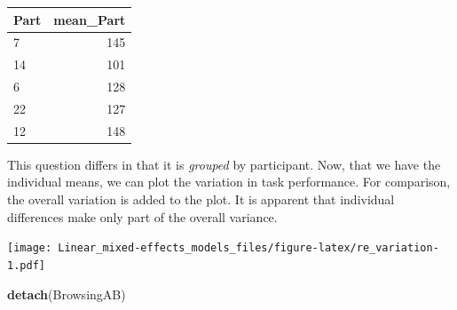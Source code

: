 \documentclass[]{svmono}
\newenvironment{Shaded}{\begin{snugshade}}{\end{snugshade}}
\newcommand{\KeywordTok}[1]{\textcolor[rgb]{0.13,0.29,0.53}{\textbf{#1}}}
\newcommand{\DataTypeTok}[1]{\textcolor[rgb]{0.13,0.29,0.53}{#1}}
\newcommand{\DecValTok}[1]{\textcolor[rgb]{0.00,0.00,0.81}{#1}}
\newcommand{\StringTok}[1]{\textcolor[rgb]{0.31,0.60,0.02}{#1}}
\newcommand{\OperatorTok}[1]{\textcolor[rgb]{0.81,0.36,0.00}{\textbf{#1}}}
\newcommand{\NormalTok}[1]{#1}
\theoremstyle{definition}
\theoremstyle{definition}
\theoremstyle{definition}
\theoremstyle{remark}
\begin{document}
\begin{tabular}{l|r}
\hline
Part & mean\_Part\\
\hline
7 & 145\\
\hline
14 & 101\\
\hline
6 & 128\\
\hline
22 & 127\\
\hline
12 & 148\\
\hline
\end{tabular}

This question differs in that it is \emph{grouped} by participant. Now,
that we have the individual means, we can plot the variation in task
performance. For comparison, the overall variation is added to the plot.
It is apparent that individual differences make only part of the overall
variance.

\begin{Shaded}
\end{Shaded}

\texttt{[image: Linear\_mixed-effects\_models\_files/figure-latex/re\_variation-1.pdf]}

\begin{Shaded}
\begin{Highlighting}[]
\KeywordTok{detach}\NormalTok{(BrowsingAB)}
\end{Highlighting}
\end{Shaded}
\end{document}
